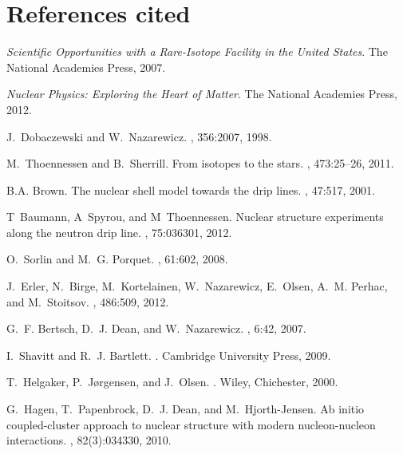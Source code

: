 \newpage




\section{References cited}

\begin{thebibliography}{200}


{\em Scientific Opportunities with a Rare-Isotope Facility in the {United
  States}}. The National Academies Press, 2007.

{\em Nuclear Physics: Exploring the Heart of Matter}. The National Academies
  Press, 2012.

J.~Dobaczewski and W.~Nazarewicz.
, 356:2007, 1998.

M.~Thoennessen and B.~Sherrill.
\newblock From isotopes to the stars.
, 473:25--26, 2011.

B.A. Brown.
\newblock The nuclear shell model towards the drip lines.
, 47:517, 2001.

T~Baumann, A~Spyrou, and M~Thoennessen.
\newblock Nuclear structure experiments along the neutron drip line.
, 75:036301, 2012.

O.~Sorlin and M.~G. Porquet.
, 61:602, 2008.

J.~Erler, N.~Birge, M.~Kortelainen, W.~Nazarewicz, E.~Olsen, A.~M. Perhac, and
  M.~Stoitsov.
, 486:509, 2012.

G.~F. Bertsch, D.~J. Dean, and W.~Nazarewicz.
, 6:42, 2007.

I.~Shavitt and R.~J. Bartlett.
.
\newblock Cambridge University Press, 2009.

T.~Helgaker, P.~J{\o}rgensen, and J.~Olsen.
.
\newblock Wiley, Chichester, 2000.

G.~Hagen, T.~Papenbrock, D.~J. Dean, and M.~Hjorth-Jensen.
\newblock Ab initio coupled-cluster approach to nuclear structure with modern
  nucleon-nucleon interactions.
, 82(3):034330, 2010.


\end{thebibliography}

